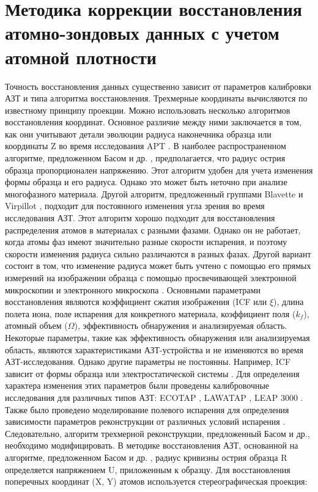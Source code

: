 \FloatBarrier

\section{Методика коррекции восстановления атомно-зондовых данных с учетом атомной плотности}\label{sec:ch3/sect5}

Точность восстановления данных существенно зависит от параметров калибровки АЗТ и типа алгоритма восстановления. Трехмерные координаты вычисляются по известному принципу проекции. Можно использовать несколько алгоритмов восстановления координат. Основное различие между ними заключается в том, как они учитывают детали эволюции радиуса наконечника образца или координаты Z во время исследования APT \cite{Vurpillot16}. В наиболее распространенном алгоритме, предложенном Басом и др. \cite{Bas95}, предполагается, что радиус острия образца пропорционален напряжению. Этот алгоритм удобен для учета изменения формы образца и его радиуса. Однако это может быть неточно при анализе многофазного материала. Другой алгоритм, предложенный группами Blavette и Virpillot \cite{Vurpillot11,Gault11}, подходит для постоянного изменения угла зрения во время исследования АЗТ. Этот алгоритм хорошо подходит для восстановления распределения атомов в материалах с разными фазами. Однако он не работает, когда атомы фаз имеют значительно разные скорости испарения, и поэтому скорости изменения радиуса сильно различаются в разных фазах. Другой вариант состоит в том, что изменение радиуса может быть учтено с помощью его прямых измерений на изображении образца с помощью просвечивающей электронной микроскопии и электронного микроскопа \cite{Larson11}. Основными параметрами восстановления являются коэффициент сжатия изображения (ICF или $\xi$), длина полета иона, поле испарения для конкретного материала, коэффициент поля ($k_f$), атомный объем ($\Omega$), эффективность обнаружения и анализируемая область. Некоторые параметры, такие как эффективность обнаружения или анализируемая область, являются характеристиками АЗТ-устройства и не изменяются во время АЗТ-исследования. Однако другие параметры не постоянны. Например, ICF зависит от формы образца или электростатической системы \cite{Geiser09,Gipson08}. Для определения характера изменения этих параметров были проведены калибровочные исследования для различных типов АЗТ: ECOTAP \cite{Geiser09}, LAWATAP \cite{Renaud03}, LEAP 3000 \cite{Renaud06}. Также было проведено моделирование полевого испарения для определения зависимости параметров реконструкции от различных условий испарения \cite{Vurpillot11,Miller14,Hatzoglou19}. Следовательно, алгоритм трехмерной реконструкции, предложенный Басом и др., необходимо модифицировать. В методике восстановления АЗТ, основанной на алгоритме, предложенном Басом и др. \cite{Bas95}, радиус кривизны острия образца R определяется напряжением U, приложенным к образцу. Для восстановления поперечных координат (X, Y) атомов используется стереографическая проекция:

